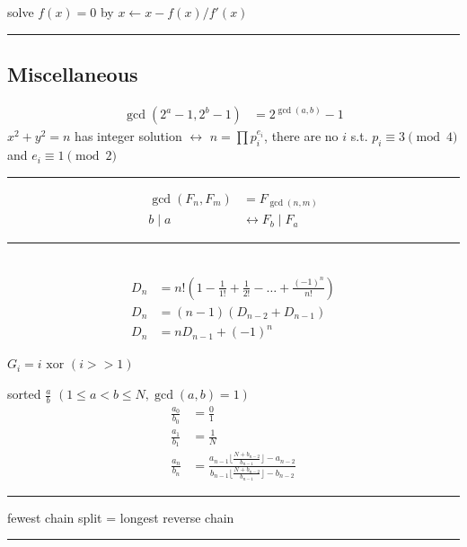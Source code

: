 \documentclass[10pt,letterpaper,landscape]{article}
\begin{document}
\begin{multicols}{2}
 solve $f(x) = 0$ by $x \leftarrow x - f(x) / f'(x)$

\noindent\rule{\linewidth}{1pt}

\subsection{Miscellaneous}

\begin{align*}
	\gcd(2^a-1, 2^b-1) &= 2^{\gcd(a,b)}-1
\end{align*}
$x^2 + y^2 = n$ has integer solution $\leftrightarrow$ $n = \prod{p_i^{e_i}}$, there are no $i$ s.t. $p_i \equiv 3 \pmod{4}$ and $e_i \equiv 1 \pmod{2}$

\noindent\rule{\linewidth}{1pt}

\begin{align*}
	\gcd(F_n, F_m) &= F_{\gcd(n, m)} \\
	b \mid a &\leftrightarrow F_b \mid F_a
\end{align*}

\noindent\rule{\linewidth}{1pt}

 \\
\begin{align*}
	D_n &= n! (1 - \frac{1}{1!} + \frac{1}{2!} - \hdots + \frac{(-1)^n}{n!}) \\
	D_n &= (n-1)(D_{n-2} + D_{n-1}) \\
	D_n &= n D_{n-1} + (-1)^n
\end{align*}

 $G_i = i \text{ xor } (i >> 1)$

 sorted $\frac{a}{b}$ $(1 \le a < b \le N, \gcd(a,b) = 1)$
\begin{align*}
	\frac{a_0}{b_0} &= \frac{0}{1} \\
	\frac{a_1}{b_1} &= \frac{1}{N} \\
	\frac{a_n}{b_n} &= \frac{a_{n-1} \lfloor \frac{N+b_{n-2}}{b_{n-1}} \rfloor - a_{n-2}}{b_{n-1} \lfloor \frac{N+b_{n-2}}{b_{n-1}} \rfloor - b_{n-2}}
\end{align*}

\noindent\rule{\linewidth}{1pt}

 fewest chain split = longest reverse chain

\noindent\rule{\linewidth}{1pt}

\end{multicols}
\end{document}
